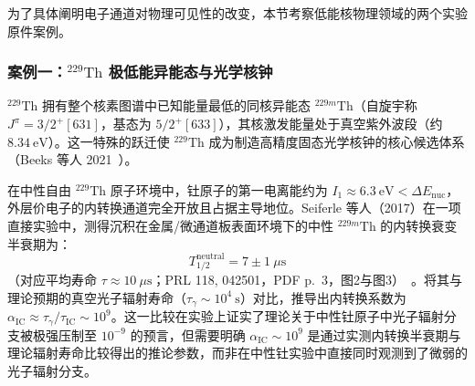 为了具体阐明电子通道对物理可见性的改变，本节考察低能核物理领域的两个实验原件案例。

\subsubsection{案例一：$^{229}\mathrm{Th}$ 极低能异能态与光学核钟}

$^{229}\mathrm{Th}$ 拥有整个核素图谱中已知能量最低的同核异能态 $^{229m}\mathrm{Th}$（自旋宇称 $J^\pi = 3/2^+ [631]$，基态为 $5/2^+ [633]$），其核激发能量处于真空紫外波段（约 $8.34\ \mathrm{eV}$）。这一特殊的跃迁使 $^{229}\mathrm{Th}$ 成为制造高精度固态光学核钟的核心候选体系（Beeks 等人 2021~\cite{beeks-2021-thorium-229-isomer-nuclear-clock}）。

在中性自由 $^{229}\mathrm{Th}$ 原子环境中，钍原子的第一电离能约为 $I_1 \approx 6.3\ \mathrm{eV} < \Delta E_{\mathrm{nuc}}$，外层价电子的内转换通道完全开放且占据主导地位。Seiferle 等人（2017）在一项直接实验中，测得沉积在金属/微通道板表面环境下的中性 $^{229m}\mathrm{Th}$ 的内转换衰变半衰期为：
\begin{equation}\label{eq:4-8-seiferle-half-life}
T_{1/2}^{\mathrm{neutral}} = 7 \pm 1\ \mu\mathrm{s}
\end{equation}
（对应平均寿命 $\tau \approx 10\ \mu\mathrm{s}$；PRL 118, 042501，PDF p.~3，图2与图3）~\cite{seiferle-2017-lifetime-229th-isomer}。将其与理论预期的真空光子辐射寿命（$\tau_\gamma \sim 10^4\ \mathrm{s}$）对比，推导出内转换系数为 $\alpha_{\mathrm{IC}} \approx \tau_\gamma / \tau_{\mathrm{IC}} \sim 10^9$。这一比较在实验上证实了理论关于中性钍原子中光子辐射分支被极强压制至 $10^{-9}$ 的预言，但需要明确 $\alpha_{\mathrm{IC}} \sim 10^9$ 是通过实测内转换半衰期与理论辐射寿命比较得出的推论参数，而非在中性钍实验中直接同时观测到了微弱的光子辐射分支。

